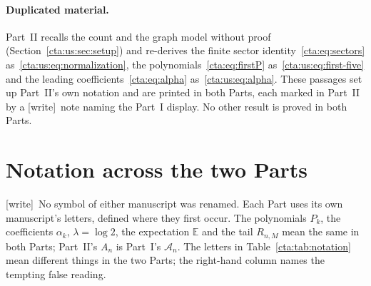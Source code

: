 \documentclass[11pt]{article}
\theoremstyle{definition}
\theoremstyle{remark}
\newcommand{\E}{\mathbb E}
\newcommand{\la}{\lambda}
\newcommand{\As}{\mathcal A}
\newcommand{\wtag}{\textup{[write]}}
\begin{document}
\paragraph{Duplicated material.} Part~II recalls the count and the graph
model without proof (Section~\ref{cta:us:sec:setup}) and re-derives the
finite sector identity~\eqref{cta:eq:sectors} as~\eqref{cta:us:eq:normalization},
the polynomials~\eqref{cta:eq:firstP} as~\eqref{cta:us:eq:first-five} and the
leading coefficients~\eqref{cta:eq:alpha} as~\eqref{cta:us:eq:alpha}. These
passages set up Part~II's own notation and are printed in both Parts, each
marked in Part~II by a \wtag\ note naming the Part~I display. No other
result is proved in both Parts.

\section{Notation across the two Parts}\label{cta:sec:notation}

\wtag\ No symbol of either manuscript was renamed. Each Part uses its own
manuscript's letters, defined where they first occur. The polynomials
$P_k$, the coefficients $\alpha_k$, $\la=\log2$, the expectation $\E$ and
the tail $R_{n,M}$ mean the same in both Parts; Part~II's $A_n$ is
Part~I's $\As_n$. The letters in Table~\ref{cta:tab:notation} mean
different things in the two Parts; the right-hand column names the
tempting false reading.
\end{document}
